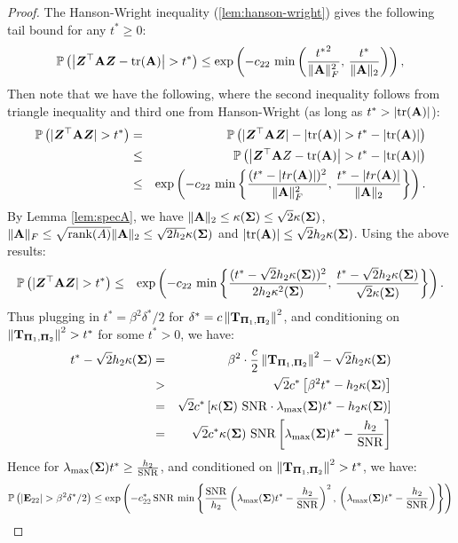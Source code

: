 \documentclass[numsec,webpdf,modern,medium,namedate]{oup-authoring-template}
\theoremstyle{thmstyleone}%
\theoremstyle{thmstyletwo}%
\theoremstyle{thmstylethree}%
\begin{document}
\begin{proof}
The Hanson-Wright inequality (\ref{lem:hanson-wright}) gives the following tail bound for any $t^\ast \geq 0$:
\begin{equation}
\mathbb{P} \left( \left| \boldsymbol{Z}^\top \mathbf{A} \boldsymbol{Z} - \mathrm{tr}(\mathbf{A}) \right| > t^\ast \right)
\leq \exp \left( - c_{22} \, \min \left( \frac{{t^\ast}^2}{\|\mathbf{A}\|_F^2}, \, \frac{t^\ast}{\|\mathbf{A}\|_2} \right) \right),
\end{equation}
Then note that we have the following, where the second inequality follows from triangle inequality and third one from Hanson-Wright (as long as $t^\ast > |\mathrm{tr}(\mathbf{A})|$):
\begin{eqnarray*}
    \mathbb{P} \left(|\boldsymbol{Z}^{\top} \mathbf{A} \boldsymbol{Z}|  > t^\ast \right) & = & \mathbb{P} \left(|\boldsymbol{Z}^{\top} \mathbf{A} \boldsymbol{Z}| - \left| \mathrm{tr}(\mathbf{A}) \right|  >t^\ast - \left| \mathrm{tr} (\mathbf{A}) \right|\right) \\
    & \leq & \mathbb{P} \left( \left| \boldsymbol{Z}^{\top} \mathbf{A} Z - \mathrm{tr}(\mathbf{A}) \right| > t^\ast - \left| \mathrm{tr} (\mathbf{A}) \right| \right) \\
    & \leq &  \exp \left( - c_{22} \, \min \left\{ \frac{(t^\ast - |tr(\mathbf{A})|)^2}{\|\mathbf{A}\|_F^2}, \, \frac{t^\ast - |tr(\mathbf{A})|}{\|\mathbf{A}\|_2} \right\} \right).
\end{eqnarray*}
By Lemma \ref{lem:specA}, we have 
$\|\mathbf{A}\|_{2} \leq \kappa(\boldsymbol{\Sigma}) \leq \sqrt{2}\kappa(\boldsymbol{\Sigma})$, $\|\mathbf{A}\|_{F} \leq \sqrt{\textrm{rank}(A)}\|\mathbf{A}\|_{2} \leq \sqrt{2h_2} \kappa({\boldsymbol{\Sigma}})$ and $|\mathrm{tr}(\mathbf{A})| \leq \sqrt{2}h_2\kappa(\boldsymbol{\Sigma})$. Using the above results:
\begin{eqnarray*}
    \mathbb{P} \left(  |\boldsymbol{Z}^{\top} \mathbf{A} \boldsymbol{Z}|  > t^\ast \right)
    & \leq &  \exp \left( - c_{22} \, \min \left\{ \frac{(t^\ast-\sqrt{2}h_2\kappa(\boldsymbol{\Sigma}))^2}{2h_2\kappa^2({\boldsymbol{\Sigma}})}, \, \frac{t^\ast -\sqrt{2}h_2\kappa(\boldsymbol{\Sigma})}{\sqrt{2}\kappa({\boldsymbol{\Sigma}})} \right\} \right).
\end{eqnarray*}
Thus plugging in $t^\ast = {\beta^2\delta^\ast}/{2}$ for $\delta^\ast = c\left\|\mathbf{T}_{\boldsymbol{\Pi}_1, \boldsymbol{\Pi}_2} \right\|^2$, and conditioning on $\left\|\mathbf{T}_{\boldsymbol{\Pi}_1, \boldsymbol{\Pi}_2} \right\|^2> t^\ast$ for some $t^\ast>0$, we have:
\begin{eqnarray*}
    t^\ast - \sqrt{2}h_2\kappa(\bSig)
    & = & \beta^2 \cdot \frac{c}{2}\left\|\bT_{\bPi_1, \bPi_2} \right\|^2 - \sqrt{2}h_2\kappa(\bSig)\\
    & > & \sqrt{2}c^\ast\left[\beta^2 t^\ast - h_2\kappa(\bSig)\right]\\
    & = & \sqrt{2}c^\ast\left[{\kappa(\bSig)\ \snr}\cdot \lambda_{\max}(\bSig) t^\ast - h_2\kappa(\bSig)\right]\\
    & = & \sqrt{2}c^\ast\kappa(\bSig)\ \snr\left[\lambda_{\max}(\bSig) t^\ast - \dfrac{h_2}{\snr}\right]
\end{eqnarray*}
Hence for $\lambda_{\max}(\boldsymbol{\Sigma}) t^\ast \geq \frac{h_2}{\mathrm{SNR}}$, and conditioned on $\left\|\mathbf{T}_{\boldsymbol{\Pi}_1, \boldsymbol{\Pi}_2} \right\|^2> t^\ast$, we have:
{
\footnotesize
\begin{eqnarray*}
    \mathbb{P}\left(|\mathbf{E}_{22}| > \beta^2\delta^\ast/2\right)\leq  \exp \left( - c^\ast_{22} \, \mathrm{SNR} \, \min \left\{\frac{\mathrm{SNR}}{h_2}\left(\lambda_{\max}(\boldsymbol{\Sigma}) t^\ast - \dfrac{h_2}{\mathrm{SNR}}\right)^2, \, \left(\lambda_{\max}(\boldsymbol{\Sigma}) t^\ast - \dfrac{h_2}{\mathrm{SNR}}\right) \right\}\right)
\end{eqnarray*}}
\end{proof}
\end{document}
